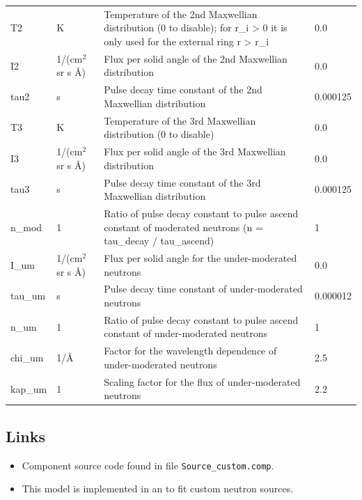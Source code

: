 \begin{longtable}{p{}p{}p{}p{}}
T2 & K & Temperature of the 2nd Maxwellian distribution (0 to disable); for r\_i \textgreater{} 0 it is only used for the external ring r \textgreater{} r\_i & 0.0 \\
I2 & 1/(cm$^{2}$ sr s \AA{}) & Flux per solid angle of the 2nd Maxwellian distribution & 0.0 \\
tau2 & s & Pulse decay time constant of the 2nd Maxwellian distribution & 0.000125 \\
T3 & K & Temperature of the 3rd Maxwellian distribution (0 to disable) & 0.0 \\
I3 & 1/(cm$^{2}$ sr s \AA{}) & Flux per solid angle of the 3rd Maxwellian distribution & 0.0 \\
tau3 & s & Pulse decay time constant of the 3rd Maxwellian distribution & 0.000125 \\
n\_mod & 1 & Ratio of pulse decay constant to pulse ascend constant of moderated neutrons (n = tau\_decay / tau\_ascend) & 1 \\
I\_um & 1/(cm$^{2}$ sr s \AA{}) & Flux per solid angle for the under-moderated neutrons & 0.0 \\
tau\_um & s & Pulse decay time constant of under-moderated neutrons & 0.000012 \\
n\_um & 1 & Ratio of pulse decay constant to pulse ascend constant of under-moderated neutrons & 1 \\
chi\_um & 1/\AA{} & Factor for the wavelength dependence of under-moderated neutrons & 2.5 \\
kap\_um & 1 & Scaling factor for the flux of under-moderated neutrons & 2.2 \\
\bottomrule
\end{longtable}

\subsection*{Links}
\begin{itemize}
  \item Component source code found in file \texttt{Source\_custom.comp}.
  \item This model is implemented in an  to fit custom neutron sources.
\end{itemize}
